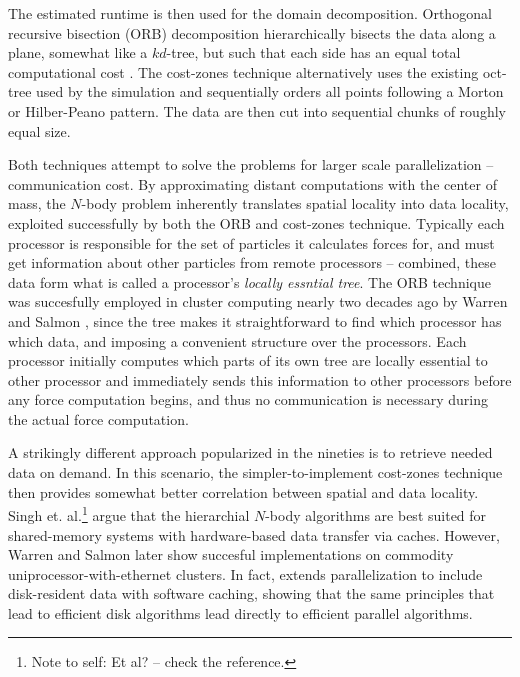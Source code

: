 \documentclass[times, leqno,twocolumn]{article}
\newcommand{\authornote}[1]{\footnote{Note to self: #1}}
\begin{document}
The estimated runtime is then used for the domain decomposition.
Orthogonal recursive bisection (ORB) decomposition hierarchically bisects the data along a plane, somewhat like a $kd$-tree, but such that each side has an equal total computational cost \cite{singh95load, liu94experiences, warren93parallel}.
The cost-zones technique alternatively uses the existing oct-tree used by the simulation and sequentially orders all points following a Morton or Hilber-Peano pattern.
The data are then cut into sequential chunks of roughly equal size.

Both techniques attempt to solve the problems for larger scale parallelization -- communication cost.
By approximating distant computations with the center of mass, the $N$-body problem inherently translates spatial locality into data locality, exploited successfully by both the ORB and cost-zones technique.
Typically each processor is responsible for the set of particles it calculates forces for, and must get information about other particles from remote processors -- combined, these data form what is called a processor's {\it locally essntial tree}.
The ORB technique was succesfully employed in cluster computing nearly two decades ago by Warren and Salmon \cite{warren92astrophysical}, since the tree makes it straightforward to find which processor has which data, and imposing a convenient structure over the processors.
Each processor initially computes which parts of its own tree are locally essential to other processor and immediately sends this information to other processors before any force computation begins, and thus no communication is necessary during the actual force computation.

A strikingly different approach popularized in the nineties is to retrieve needed data on demand.
In this scenario, the simpler-to-implement cost-zones technique then provides somewhat better correlation between spatial and data locality.
Singh et. al.\authornote{Et al? -- check the reference.} \cite{singh95load, singh92implications} argue that the hierarchial $N$-body algorithms are best suited for shared-memory systems with hardware-based data transfer via caches.
However, Warren and Salmon later \cite{warren93parallel,salmon97parallel} show succesful implementations on commodity uniprocessor-with-ethernet clusters.
In fact, \cite{salmon97parallel} extends parallelization to include disk-resident data with software caching, showing that the same principles that lead to efficient disk algorithms lead directly to efficient parallel algorithms.
\end{document}
